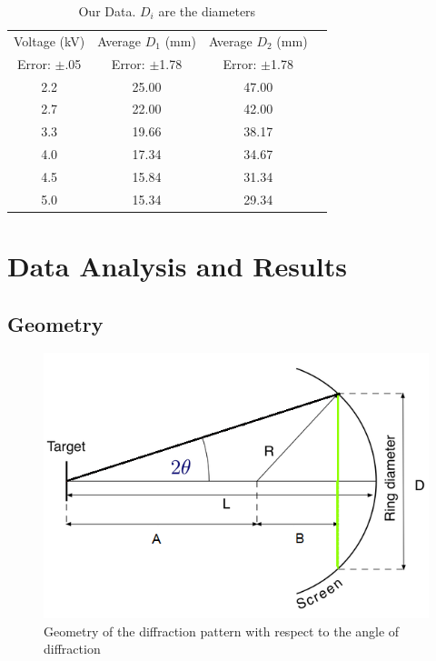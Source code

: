 \documentclass[11pt,letterpaper,onecolumn]{article}
\begin{document}
\begin{table}[H]
\centering
\begin{tabular}{|c|c|c|c|}
\hline
 Voltage (kV) & Average $D_1$ (mm) & Average $D_2$ (mm)\\
 Error: $\pm$.05 & Error: $\pm$1.78 & Error: $\pm$1.78 \\ \hline
 2.2 & 25.00 & 47.00 \\
 2.7 & 22.00 & 42.00 \\
 3.3 & 19.66 & 38.17 \\
 4.0 & 17.34 & 34.67 \\
 4.5 & 15.84 & 31.34 \\
 5.0 & 15.34 & 29.34 \\
 \hline
\end{tabular}
\caption{Our Data. $D_i$ are the diameters}
\label{tab:data}
\end{table}

\section{Data Analysis and Results}

\subsection{Geometry}

\begin{figure}[H]
\centering
\includegraphics{GeometryTube.PNG}
\caption{Geometry of the diffraction pattern with respect to the angle of diffraction}
\label{fig:Geo}
\end{figure}
\end{document}
